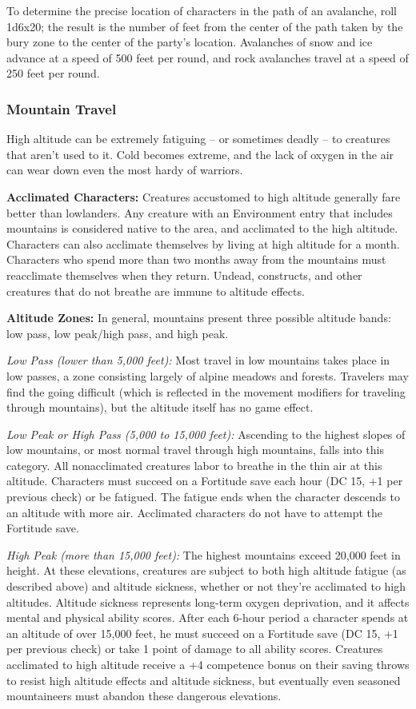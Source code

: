 To determine the precise location of characters in the path of an avalanche, roll 
1d6x20; the result is the number of feet from the center of the 
path taken by the bury zone to the center of the party's location. Avalanches of 
snow and ice advance at a speed of 500 feet per round, and rock avalanches travel 
at a speed of 250 feet per round.

\subsubsection{Mountain Travel}

High altitude can be extremely fatiguing -- or sometimes deadly -- to creatures that 
aren't used to it. Cold becomes extreme, and the lack of oxygen in the air can 
wear down even the most hardy of warriors.

\textbf{Acclimated Characters:} Creatures accustomed to high altitude generally 
fare better than lowlanders. Any creature with an Environment entry that includes 
mountains is considered native to the area, and acclimated to the high altitude. 
Characters can also acclimate themselves by living at high altitude for a month. 
Characters who spend more than two months away from the mountains must reacclimate 
themselves when they return. Undead, constructs, and other creatures that do not 
breathe are immune to altitude effects.

\textbf{Altitude Zones:} In general, mountains present three possible altitude 
bands: low pass, low peak/high pass, and high peak. 

\textit{Low Pass (lower than 5,000 feet):} Most travel in low mountains takes place 
in low passes, a zone consisting largely of alpine meadows and forests. Travelers 
may find the going difficult (which is reflected in the movement modifiers for 
traveling through mountains), but the altitude itself has no game effect.

\textit{Low Peak or High Pass (5,000 to 15,000 feet):} Ascending to the highest 
slopes of low mountains, or most normal travel through high mountains, falls into 
this category. All nonacclimated creatures labor to breathe in the thin air at 
this altitude. Characters must succeed on a Fortitude save each hour (DC 15, +1 
per previous check) or be fatigued. The fatigue ends when the character descends 
to an altitude with more air. Acclimated characters do not have to attempt the 
Fortitude save. 

\textit{High Peak (more than 15,000 feet):} The highest mountains exceed 20,000 
feet in height. At these elevations, creatures are subject to both high altitude 
fatigue (as described above) and altitude sickness, whether or not they're acclimated 
to high altitudes. Altitude sickness represents long-term oxygen deprivation, 
and it affects mental and physical ability scores. After each 6-hour period a character 
spends at an altitude of over 15,000 feet, he must succeed on a Fortitude save 
(DC 15, +1 per previous check) or take 1 point of damage to all ability scores. 
Creatures acclimated to high altitude receive a +4 competence bonus on their saving 
throws to resist high altitude effects and altitude sickness, but eventually even 
seasoned mountaineers must abandon these dangerous elevations. 

